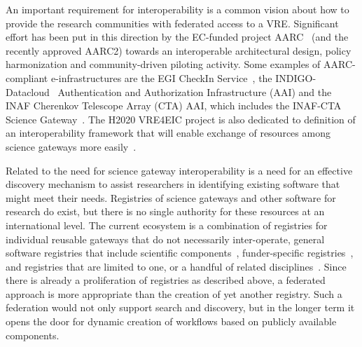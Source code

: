 \documentclass[review]{elsarticle}
\begin{document}
An important requirement for  interoperability is a common vision about how to provide the research communities with federated access to a VRE. 
Significant effort has been put in this direction by the EC-funded project AARC~\cite{aarc-50} (and the recently approved  AARC2) towards an interoperable architectural design, policy harmonization and community-driven piloting activity. Some examples of AARC-compliant e-infrastructures are the EGI CheckIn Service~\cite{aai-51}, the  INDIGO-Datacloud~\cite{indigo-52} Authentication and Authorization Infrastructure (AAI)  and the INAF Cherenkov Telescope Array (CTA) AAI, which includes the INAF-CTA Science Gateway~\cite{Costa2015-53}. The H2020 VRE4EIC project is also dedicated to definition of an interoperability framework that will enable exchange of resources among science gateways more easily~\cite{vre4eic-21}.

Related to the need for science gateway interoperability is a need for an effective discovery mechanism to assist researchers in identifying existing software that might meet their needs. Registries of science gateways and other software for research do exist, but there is no single authority for these resources at an international level. The current ecosystem is a combination of registries for individual reusable gateways \cite{alces-54, hubzero-55} that do not necessarily inter-operate, general software registries that include scientific components~\cite{github-56,openhatch-57}, funder-specific registries~\cite{canarie-58}, and registries that are limited to one, or a handful of related disciplines~\cite{iplant-59,cyverse-60}. Since there is already a proliferation of registries as described above, a federated approach is more appropriate than the creation of yet another registry. Such a federation would not only support search and discovery, but in the longer term it opens the door for dynamic creation of workflows based on publicly available components.
\end{document}
